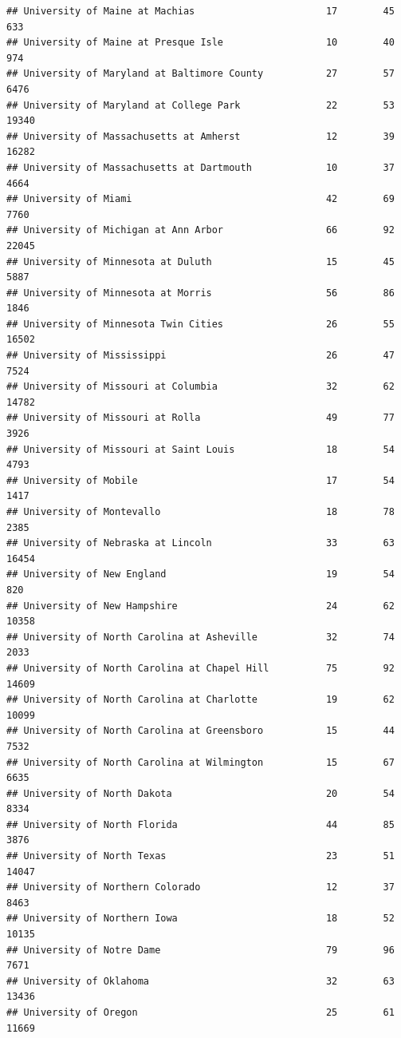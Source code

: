 \documentclass[
]{article}
\begin{document}
\begin{verbatim}
## University of Maine at Machias                       17        45         633
## University of Maine at Presque Isle                  10        40         974
## University of Maryland at Baltimore County           27        57        6476
## University of Maryland at College Park               22        53       19340
## University of Massachusetts at Amherst               12        39       16282
## University of Massachusetts at Dartmouth             10        37        4664
## University of Miami                                  42        69        7760
## University of Michigan at Ann Arbor                  66        92       22045
## University of Minnesota at Duluth                    15        45        5887
## University of Minnesota at Morris                    56        86        1846
## University of Minnesota Twin Cities                  26        55       16502
## University of Mississippi                            26        47        7524
## University of Missouri at Columbia                   32        62       14782
## University of Missouri at Rolla                      49        77        3926
## University of Missouri at Saint Louis                18        54        4793
## University of Mobile                                 17        54        1417
## University of Montevallo                             18        78        2385
## University of Nebraska at Lincoln                    33        63       16454
## University of New England                            19        54         820
## University of New Hampshire                          24        62       10358
## University of North Carolina at Asheville            32        74        2033
## University of North Carolina at Chapel Hill          75        92       14609
## University of North Carolina at Charlotte            19        62       10099
## University of North Carolina at Greensboro           15        44        7532
## University of North Carolina at Wilmington           15        67        6635
## University of North Dakota                           20        54        8334
## University of North Florida                          44        85        3876
## University of North Texas                            23        51       14047
## University of Northern Colorado                      12        37        8463
## University of Northern Iowa                          18        52       10135
## University of Notre Dame                             79        96        7671
## University of Oklahoma                               32        63       13436
## University of Oregon                                 25        61       11669

\end{verbatim}
\end{document}
